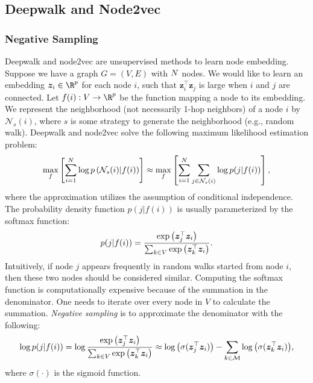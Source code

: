    
\subsection{Deepwalk and Node2vec}
    \subsubsection{Negative Sampling}
    Deepwalk and node2vec are unsupervised methods to learn node embedding.
    Suppose we have a graph $G=(V, E)$ with $N$ nodes.
    We would like to learn an embedding $\bm{z}_i \in \R^\nfeat$ for each node $i$, such that $\bm{z}^{\top}_i \bm{z}_j$ is large when $i$ and $j$ are connected.
    Let $f(i): V \rightarrow \R^\nfeat$ be the function mapping a node to its embedding.
    We represent the neighborhood (not necessarily 1-hop neighbors) of a node $i$ by $\mathcal{N}_{s}(i)$, where $s$ is some strategy to generate the neighborhood (e.g., random walk).
    Deepwalk and node2vec solve the following maximum likelihood estimation problem:
        \begin{equation}
            \max_{f} \left[ \sum_{i=1}^{N}{ \log p\left(\mathcal{N}_s(i) | f(i) \right)} \right] \approx \max_{f} \left[ \sum_{i=1}^{N}{ \sum_{j \in \mathcal{N}_s(i)}^{}{\log p(j | f(i))} } \right],
        \end{equation}
    where the approximation utilizes the assumption of conditional independence.
    The probability density function $p(j | f(i))$ is usually parameterized by the softmax function:
        \begin{equation}
            p(j | f(i)) = \frac{ \text{exp}\left( \bm{z}_j^\top \bm{z}_i \right) }{\sum_{k\in V}^{}{ \text{exp}\left( \bm{z}_k^\top \bm{z}_i \right) }}.
        \end{equation}
    Intuitively, if node $j$ appears frequently in random walks started from node $i$, then these two nodes should be considered similar.
    Computing the softmax function is computationally expensive because of the summation in the denominator. One needs to iterate over every node in $V$ to calculate the summation.
    \emph{Negative sampling} is to approximate the denominator with the following:
        \begin{equation}\label{eq:negative_sampling}
            \log{ p(j | f(i)) } = \log \frac{ \text{exp}\left( \bm{z}_j^\top \bm{z}_i \right) }{\sum_{k\in V}^{}{ \text{exp}\left( \bm{z}_k^\top \bm{z}_i \right) }} \approx \log\left( \sigma(\bm{z}_j^\top \bm{z}_i) \right)  - \sum_{k\in \mathcal{M}}^{}{\log\left( \sigma(\bm{z}_k^\top \bm{z}_i) \right)},
        \end{equation}
    where $\sigma(\cdot)$ is the sigmoid function.

